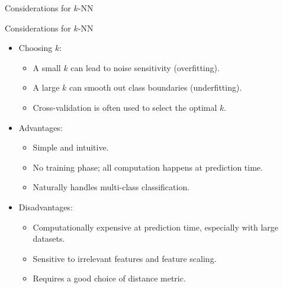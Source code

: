 \documentclass[hyperref={pdfpagelabels=false},aspectratio=169]{beamer}
\begin{document}
\begin{frame}[label={sec:orga3865fd}]{Considerations for \(k\)-NN}
\begin{block}{Considerations for \(k\)-NN}
\begin{itemize}[<+->]
\item \alert{Choosing \(k\)}:
\begin{itemize}
\item A small \(k\) can lead to noise sensitivity (overfitting).
\item A large \(k\) can smooth out class boundaries (underfitting).
\item Cross-validation is often used to select the optimal \(k\).
\end{itemize}
\item \alert{Advantages}:
\begin{itemize}
\item Simple and intuitive.
\item No training phase; all computation happens at prediction time.
\item Naturally handles multi-class classification.
\end{itemize}
\item \alert{Disadvantages}:
\begin{itemize}
\item Computationally expensive at prediction time, especially with large datasets.
\item Sensitive to irrelevant features and feature scaling.
\item Requires a good choice of distance metric.
\end{itemize}
\end{itemize}
\end{block}
\end{frame}
\end{document}
